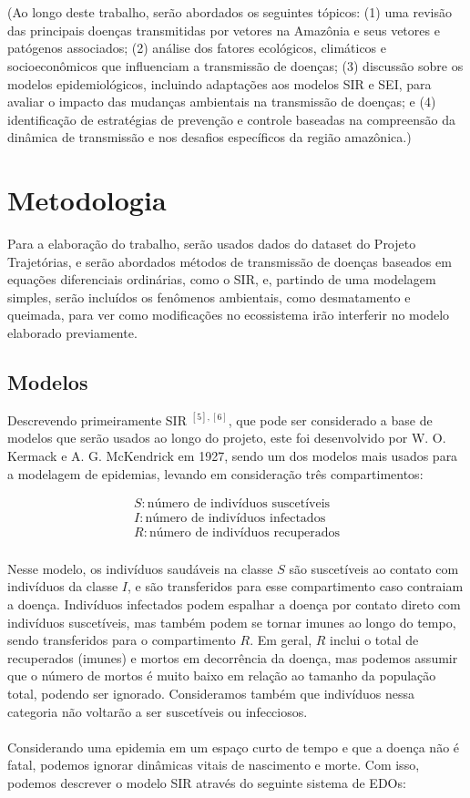 \documentclass[12pt]{article}
\begin{document}
\\\\
(Ao longo deste trabalho, serão abordados os seguintes tópicos: (1) uma revisão das principais doenças transmitidas por vetores na Amazônia e seus vetores e patógenos associados; (2) análise dos fatores ecológicos, climáticos e socioeconômicos que influenciam a transmissão de doenças; (3) discussão sobre os modelos epidemiológicos, incluindo adaptações aos modelos SIR e SEI, para avaliar o impacto das mudanças ambientais na transmissão de doenças; e (4) identificação de estratégias de prevenção e controle baseadas na compreensão da dinâmica de transmissão e nos desafios específicos da região amazônica.)

\section{Metodologia}

Para a elaboração do trabalho, serão usados dados do dataset do Projeto Trajetórias, e serão abordados métodos de transmissão de doenças baseados em equações diferenciais ordinárias, como o SIR, e, partindo de uma modelagem simples, serão incluídos os fenômenos ambientais, como desmatamento e queimada, para ver como modificações no ecossistema irão interferir no modelo elaborado previamente.

\subsection{Modelos}

Descrevendo primeiramente SIR $^{[5], [6]}$, que pode ser considerado a base de modelos que serão usados ao longo do projeto, este foi desenvolvido por W. O. Kermack e A. G. McKendrick em 1927, sendo um dos modelos mais usados para a modelagem de epidemias, levando em consideração três compartimentos:

\begin{gather*}
    S: \text{número de indivíduos suscetíveis} \\
    I: \text{número de indivíduos infectados} \\
    R: \text{número de indivíduos recuperados}
\end{gather*}
\\
Nesse modelo, os indivíduos saudáveis na classe $S$ são suscetíveis ao contato com indivíduos da classe $I$, e são transferidos para esse compartimento caso contraiam a doença. Indivíduos infectados podem espalhar a doença por contato direto com indivíduos suscetíveis, mas também podem se tornar imunes ao longo do tempo, sendo transferidos para o compartimento $R$. Em geral, $R$ inclui o total de recuperados (imunes) e mortos em decorrência da doença, mas podemos assumir que o número de mortos é muito baixo em relação ao tamanho da população total, podendo ser ignorado. Consideramos também que indivíduos nessa categoria não voltarão a ser suscetíveis ou infecciosos.   
\\\\
Considerando uma epidemia em um espaço curto de tempo e que a doença não é fatal, podemos ignorar dinâmicas vitais de nascimento e morte. Com isso, podemos descrever o modelo SIR através do seguinte sistema de EDOs:
\end{document}

